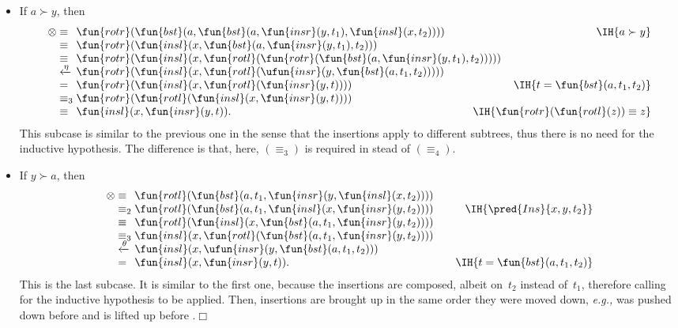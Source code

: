 \begin{itemize}
\begin{itemize}
    \item If \(a \succ y\), then
\begin{equation*}
\begin{array}{@{}r@{\;}l@{\;}l@{\hspace{-9mm}}r@{}}
  \otimes & \equiv & \fun{rotr}(\fun{bst}(a,
  \fun{bst}(a,\fun{insr}(y,t_1),\fun{insl}(x,t_2))))
  & \IH{a \succ y}\\
  & \equiv &
  \fun{rotr}(\fun{insl}(x,\fun{bst}(a,\fun{insr}(y,t_1),t_2)))\\
  & \equiv & \fun{rotr}(\fun{insl}(x,
  \fun{rotl}(\fun{rotr}(\fun{bst}(a,\fun{insr}(y,t_1),t_2)))))\\
  & \xleftarrow{\smash{\eta}} &
  \fun{rotr}(\fun{insl}(x,\fun{rotl}(\ufun{insr}(y,
  \fun{bst}(a,t_1,t_2)))))\\
  & = & \fun{rotr}(\fun{insl}(x,\fun{rotl}(\fun{insr}(y,t))))
  & \IH{t=\fun{bst}(a,t_1,t_2)}\\
  & \equiv_3 &
  \fun{rotr}(\fun{rotl}(\fun{insl}(x,\fun{insr}(y,t))))\\
  & \equiv & \fun{insl}(x,\fun{insr}(y,t)).
  & \IH{\fun{rotr}(\fun{rotl}(z)) \equiv z}
\end{array}
\end{equation*}
This subcase is similar to the previous one in the sense that the
insertions apply to different subtrees, thus there is no need for the
inductive hypothesis. The difference is that, here, \((\equiv_3)\) is
required in stead of \((\equiv_4)\).

  \item If \(y \succ a\), then
\begin{equation*}
\begin{array}{@{}r@{\;}l@{\;}l@{\qquad}r@{}}
  \otimes & \equiv &
  \fun{rotl}(\fun{bst}(a,t_1,\fun{insr}(y,\fun{insl}(x,t_2))))\\
  & \equiv_2 & \fun{rotl}(\fun{bst}(a,t_1,\fun{insl}(x,
  \fun{insr}(y,t_2))))
  & \IH{\pred{Ins}{x,y,t_2}}\\
  & \equiv &
  \fun{rotl}(\fun{insl}(x,\fun{bst}(a,t_1,\fun{insr}(y,t_2))))\\
  & \equiv_3 & \fun{insl}(x,\fun{rotl}(\fun{bst}(a,t_1,
  \fun{insr}(y,t_2))))\\
  & \xleftarrow{\smash{\theta}}
  & \fun{insl}(x,\ufun{insr}(y,\fun{bst}(a,t_1,t_2)))\\
  & = & \fun{insl}(x,\fun{insr}(y,t)).
  & \IH{t=\fun{bst}(a,t_1,t_2)}
\end{array}
\end{equation*}
This is the last subcase. It is similar to the first one, because the
insertions are composed, albeit on~\(t_2\) instead of~\(t_1\),
therefore calling for the inductive hypothesis to be applied. Then,
insertions are brought up in the same order they were moved down,
\emph{e.g.,}  was pushed down before  and is
lifted up before .\hfill\(\Box\)
  \end{itemize}

\end{itemize}

